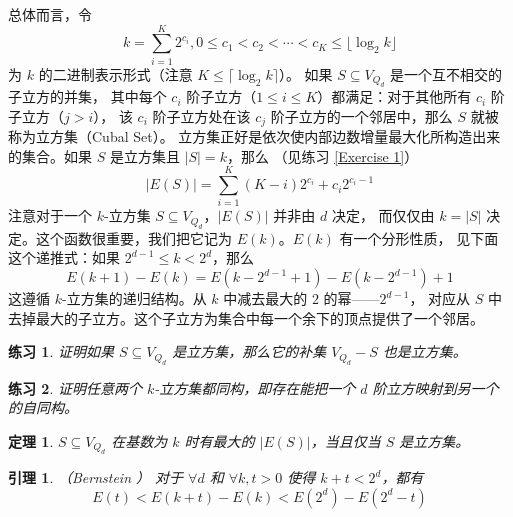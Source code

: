 \documentclass[12pt, a4paper]{article}
\newtheorem{theorem}{定理}
\newtheorem{lemma}{引理}
\newtheorem{exercise}{练习}
\begin{document}
总体而言，令
\begin{equation*}
k = \sum_{i = 1}^K 2^{c_i}, 0 \le c_1 < c_2 < \cdots < c_K \le \lfloor \log_2 k \rfloor
\end{equation*}
为 $k$ 的二进制表示形式（注意 $K \le \lceil \log_2 k \rceil$）。
如果 $S \subseteq V_{Q_d}$ 是一个互不相交的子立方的并集，
其中每个 $c_i$ 阶子立方（$1 \le i \le K$）都满足：对于其他所有 $c_i$ 阶子立方（$j > i$），
该 $c_i$ 阶子立方处在该 $c_j$ 阶子立方的一个邻居中，那么 $S$ 就被称为立方集（Cubal Set）。
立方集正好是依次使内部边数增量最大化所构造出来的集合。如果 $S$ 是立方集且 $|S| = k$，那么
（见练习 \ref{Exercise 1}）
\begin{equation*}
|E(S)| = \sum_{i = 1}^K (K - i) 2^{c_i} + c_i 2^{c_i - 1}
\end{equation*}
注意对于一个 $k$-立方集 $S \subseteq V_{Q_d}$，$|E(S)|$ 并非由 $d$ 决定，
而仅仅由 $k = |S|$ 决定。这个函数很重要，我们把它记为 $E(k)$。$E(k)$ 有一个分形性质，
见下面这个递推式：如果 $2^{d - 1} \le k < 2^d$，那么
\begin{equation*}
E(k + 1) − E(k) = E(k − 2^{d − 1} + 1) − E(k − 2^{d − 1}) + 1
\end{equation*}
这遵循 $k$-立方集的递归结构。从 $k$ 中减去最大的 $2$ 的幂——$2^{d − 1}$，
对应从 $S$ 中去掉最大的子立方。这个子立方为集合中每一个余下的顶点提供了一个邻居。

\begin{exercise}
\label{Exercise 8}
证明如果 $S \subseteq V_{Q_d}$ 是立方集，那么它的补集 $V_{Q_d} − S$ 也是立方集。
\end{exercise}

\begin{exercise}
\label{Exercise 9}
证明任意两个 $k$-立方集都同构，即存在能把一个 $d$ 阶立方映射到另一个的自同构。
\end{exercise}

\begin{theorem}
\label{Theorem 1}
$S \subseteq V_{Q_d}$ 在基数为 $k$ 时有最大的 $|E(S)|$，当且仅当 $S$ 是立方集。
\end{theorem}

\begin{lemma}
\label{Lemma 3}
（Bernstein \cite{Bernstein.1967}）
对于 $\forall d$ 和 $\forall k, t > 0$ 使得 $k + t < 2^d$，都有
\begin{equation*}
E(t) < E(k + t) − E(k) < E(2^d) − E(2^d − t)
\end{equation*}
\end{lemma}
\end{document}
